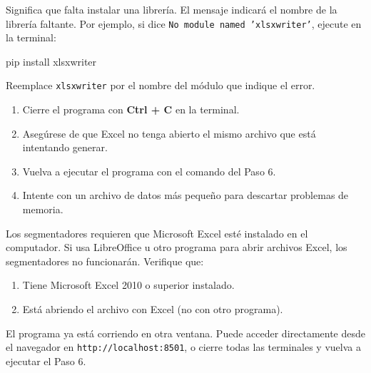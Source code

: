 \documentclass[12pt, letterpaper]{article}
\begin{document}
\begin{solucion}
  Significa que falta instalar una librería. El mensaje indicará el nombre de la librería faltante. Por ejemplo, si dice \texttt{No module named 'xlsxwriter'}, ejecute en la terminal:
  \begin{comando}
    pip install xlsxwriter
  \end{comando}
  Reemplace \texttt{xlsxwriter} por el nombre del módulo que indique el error.
\end{solucion}

\begin{solucion}
  \begin{enumerate}[leftmargin=0.5cm, label=\textcolor{rojopeligro}{\arabic*.}]
    \item Cierre el programa con \textbf{Ctrl + C} en la terminal.
    \item Asegúrese de que Excel no tenga abierto el mismo archivo que está intentando generar.
    \item Vuelva a ejecutar el programa con el comando del Paso 6.
    \item Intente con un archivo de datos más pequeño para descartar problemas de memoria.
  \end{enumerate}
\end{solucion}

\begin{solucion}
  Los segmentadores requieren que Microsoft Excel esté instalado en el computador. Si usa LibreOffice u otro programa para abrir archivos Excel, los segmentadores no funcionarán. Verifique que:
  \begin{enumerate}[leftmargin=0.5cm, label=\textcolor{rojopeligro}{\arabic*.}]
    \item Tiene Microsoft Excel 2010 o superior instalado.
    \item Está abriendo el archivo con Excel (no con otro programa).
  \end{enumerate}
\end{solucion}

\begin{solucion}
  El programa ya está corriendo en otra ventana. Puede acceder directamente desde el navegador en \texttt{http://localhost:8501}, o cierre todas las terminales y vuelva a ejecutar el Paso 6.
\end{solucion}
\end{document}
